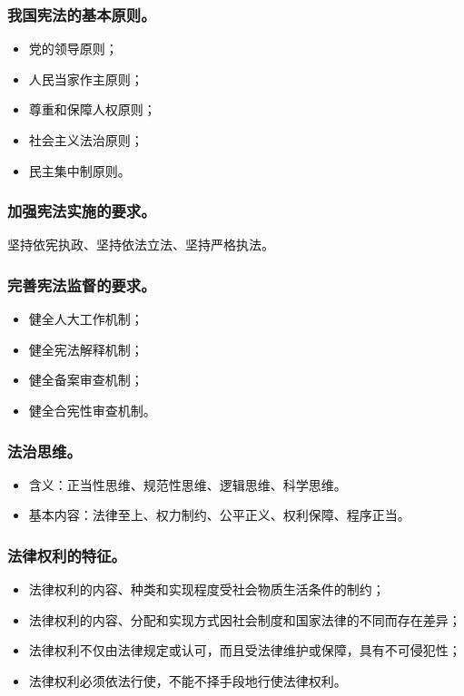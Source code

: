 \documentclass{article}
\begin{document}
\subsubsection{我国宪法的基本原则。}
\begin{itemize}
    \item 党的领导原则；
    \item 人民当家作主原则；
    \item 尊重和保障人权原则；
    \item 社会主义法治原则；
    \item 民主集中制原则。
\end{itemize}

\subsubsection{加强宪法实施的要求。}
坚持依宪执政、坚持依法立法、坚持严格执法。

\subsubsection{完善宪法监督的要求。}
\begin{itemize}
    \item 健全人大工作机制；
    \item 健全宪法解释机制；
    \item 健全备案审查机制；
    \item 健全合宪性审查机制。
\end{itemize}

\subsubsection{法治思维。}
\begin{itemize}
    \item 含义：正当性思维、规范性思维、逻辑思维、科学思维。
    \item 基本内容：法律至上、权力制约、公平正义、权利保障、程序正当。
\end{itemize}

\subsubsection{法律权利的特征。}
\begin{itemize}
    \item 法律权利的内容、种类和实现程度受社会物质生活条件的制约；
    \item 法律权利的内容、分配和实现方式因社会制度和国家法律的不同而存在差异；
    \item 法律权利不仅由法律规定或认可，而且受法律维护或保障，具有不可侵犯性；
    \item 法律权利必须依法行使，不能不择手段地行使法律权利。
\end{itemize}
\end{document}
